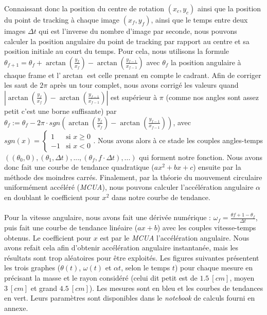 Connaissant donc la position du centre de rotation $(x_c,y_c)$ ainsi que la position du point de tracking à chaque image $(x_f, y_f)$, ainsi que le temps entre deux images $\Delta t$ qui est l'inverse du nombre d'image par seconde, nous pouvons calculer la position angulaire du point de tracking par rapport au centre et sa position initiale au court du temps. Pour cela, nous utilisons la formule $\theta_{f+1} = \theta_f + \arctan(\frac{y_f}{x_f}) - \arctan(\frac{y_{f-1}}{x_{f-1}})$ avec $\theta_f$ la position angulaire à chaque frame et l'$\arctan$ est celle prenant en compte le cadrant. Afin de corriger les saut de $2\pi$ après un tour complet, nous avons corrigé les valeurs quand $|\arctan(\frac{y_f}{x_f}) - \arctan(\frac{y_{f-1}}{x_{f-1}})|$ est supérieur à $\pi$ (comme nos angles sont assez petit c'est une borne suffisante) par $\theta_f := \theta_f - 2\pi \cdot sgn(\arctan(\frac{y_f}{x_f}) - \arctan(\frac{y_{f-1}}{x_{f-1}}))$, avec $sgn(x) = \begin{cases} 1 & \text{si } x \geq 0 \\ -1 & \text{si } x < 0 \end{cases}$. Nous avons alors à ce stade les couples angles-temps $((\theta_0, 0),(\theta_1, \Delta t),...,(\theta_f, f \cdot \Delta t),...)$ qui forment notre fonction. Nous avons donc fait une courbe de tendance quadratique ($ax^2 + bx + c$) ensuite par la méthode des moindres carrés. Finalement, par la théorie du mouvement circulaire uniformément accéléré (\textit{MCUA}), nous pouvons calculer l'accélération angulaire $\alpha$ en doublant le coefficient pour $x^2$ dans notre courbe de tendance.\\ \\
Pour la vitesse angulaire, nous avons fait une dérivée numérique : $\omega_f = \frac{\theta{f+1} - \theta_f}{\Delta t}$, puis fait une courbe de tendance linéaire ($ax+b$) avec les couples vitesse-temps obtenus. Le coefficient pour $x$ est par le \textit{MCUA} l'accélération angulaire. Nous avons refait cela afin d'obtenir accélération angulaire instantanée, mais les résultats sont trop aléatoires pour être exploités. Les figures suivantes présentent les trois graphes ($\theta(t)$, $\omega(t)$ et $\alpha{t}$, selon le temps $t$) pour chaque mesure en précisant la masse et le rayon considéré (celui dit petit est de $1.5 \ [cm]$, moyen $3 \ [cm]$ et grand $4.5 \ [cm]$). Les mesures sont en bleu et les courbes de tendances en vert. Leurs paramètres sont disponibles dans le \textit{notebook} de calculs fourni en annexe.

